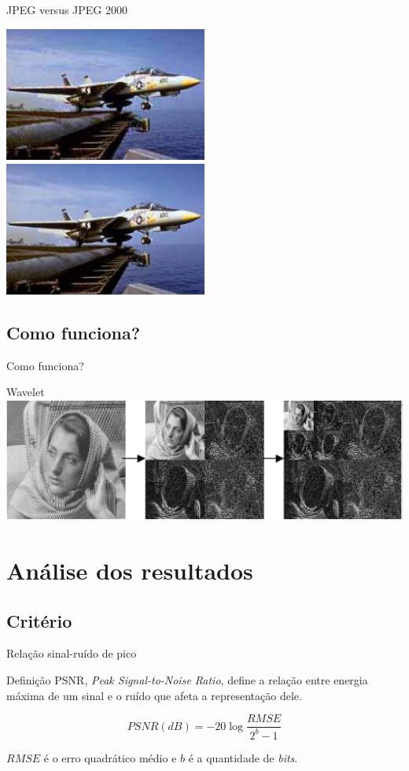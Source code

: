 \documentclass{beamer}
\begin{document}
\begin{frame}{JPEG versus JPEG 2000}
   \begin{multicols}{2}
   \includegraphics[width=0.5\textwidth]{figure/ex_jpeg_02_1.jpg}
   \includegraphics[width=0.5\textwidth]{figure/ex_jpeg2k_02_2.jpg}
   \end{multicols}
\end{frame}
\subsection{Como funciona?}
\begin{frame}{Como funciona?}

\end{frame}
\begin{frame}{Wavelet}
   \includegraphics[width=\textwidth]{figure/wavelet-1.jpg}
\end{frame}
\section{Análise dos resultados}
\subsection{Critério}
\begin{frame}{Relação sinal-ruído de pico}
   \begin{block}{Definição}
      PSNR, \emph{Peak Signal-to-Noise Ratio}, define a relação entre energia máxima de um sinal e o ruído que afeta a representação dele.

      $$ PSNR(dB) = -20 \log \frac{RMSE}{2^b -1} $$

      $RMSE$ é o erro quadrático médio e $b$ é a quantidade de \emph{bits}.
   \end{block}
\end{frame}
\end{document}
